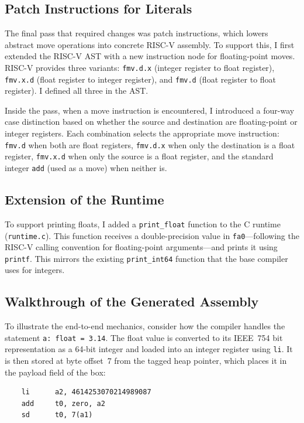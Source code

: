 \subsection{Patch Instructions for Literals}

The final pass that required changes was patch instructions, which lowers abstract move operations into concrete RISC-V assembly. To support this, I first extended the RISC-V AST with a new instruction node for floating-point moves. RISC-V provides three variants: \texttt{fmv.d.x} (integer register to float register), \texttt{fmv.x.d} (float register to integer register), and \texttt{fmv.d} (float register to float register). I defined all three in the AST.

Inside the pass, when a move instruction is encountered, I introduced a four-way case distinction based on whether the source and destination are floating-point or integer registers. Each combination selects the appropriate move instruction: \texttt{fmv.d} when both are float registers, \texttt{fmv.d.x} when only the destination is a float register, \texttt{fmv.x.d} when only the source is a float register, and the standard integer \texttt{add} (used as a move) when neither is.

\subsection{Extension of the Runtime}

To support printing floats, I added a \texttt{print\_float} function to the C runtime (\texttt{runtime.c}). This function receives a double-precision value in \texttt{fa0}---following the RISC-V calling convention for floating-point arguments---and prints it using \texttt{printf}. This mirrors the existing \texttt{print\_int64} function that the base compiler uses for integers.

\subsection{Walkthrough of the Generated Assembly}

To illustrate the end-to-end mechanics, consider how the compiler handles the statement \texttt{a: float = 3.14}. The float value is converted to its IEEE~754 bit representation as a 64-bit integer and loaded into an integer register using \texttt{li}. It is then stored at byte offset~7 from the tagged heap pointer, which places it in the payload field of the box:

\begin{lstlisting}
    li      a2, 4614253070214989087
    add     t0, zero, a2
    sd      t0, 7(a1)
\end{lstlisting}

